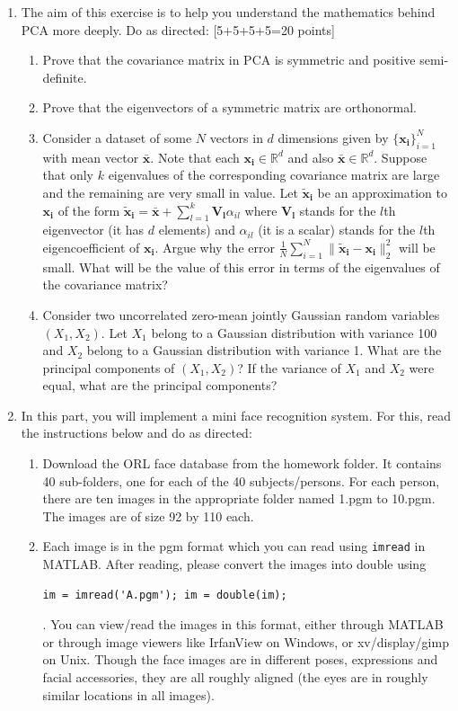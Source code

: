 \documentclass[11pt]{article}
\begin{document}
\begin{enumerate}
\item The aim of this exercise is to help you understand the mathematics behind PCA more deeply. Do as directed: \textsf{[5+5+5+5=20 points]}
\begin{enumerate}
\item Prove that the covariance matrix in PCA is symmetric and positive semi-definite.
\item Prove that the eigenvectors of a symmetric matrix are orthonormal.
\item Consider a dataset of some $N$ vectors in $d$ dimensions given by $\{\boldsymbol{x_i}\}_{i=1}^N$ with mean vector $\boldsymbol{\bar{x}}$. Note that each $\boldsymbol{x_i} \in \mathbb{R}^d$ and also $\boldsymbol{\bar{x}} \in \mathbb{R}^d$.
Suppose that only $k$ eigenvalues of the corresponding covariance matrix are large and the remaining are very small in value. Let $\boldsymbol{\tilde{x}_i}$ be an approximation to $\boldsymbol{x_i}$ of the form $\boldsymbol{\tilde{x}_i} = \boldsymbol{\bar{x}} + \sum_{l=1}^k \boldsymbol{V_l} \alpha_{il}$ where $\boldsymbol{V_l}$ stands for the $l$th eigenvector (it has $d$ elements) and $\alpha_{il}$ (it is a scalar) stands for the $l$th eigencoefficient of $\boldsymbol{x_i}$. Argue why the error $\frac{1}{N} \sum_{i=1}^N \|\boldsymbol{\tilde{x}_i} - \boldsymbol{x_i}\|^2_2$ will be small. What will be the value of this error in terms of the eigenvalues of the covariance matrix?   
\item Consider two uncorrelated zero-mean jointly Gaussian random variables $(X_1, X_2)$. Let $X_1$ belong to a Gaussian distribution with variance 100 and $X_2$ belong to a Gaussian distribution with variance 1. What are the principal components of $(X_1, X_2)$? If the variance of $X_1$ and $X_2$ were equal, what are the principal components? 
\end{enumerate}

\item In this part, you will implement a mini face recognition system. For this, read the instructions below and do as directed:
\begin{enumerate}
\item Download the ORL face database from the homework folder. It contains 40 sub-folders, one for each of the 40 subjects/persons. For each person, there are ten images in the appropriate folder named 1.pgm to 10.pgm. The images are of size 92 by 110 each. 

\item Each image is in the pgm format which you can read using \texttt{imread} in MATLAB. After reading, please convert the images into double using \begin{verbatim}im = imread('A.pgm'); im = double(im);\end{verbatim}. You can view/read the images in this format, either through MATLAB or through image viewers like IrfanView on Windows, or xv/display/gimp on Unix. Though the face images are in different poses, expressions and facial accessories, they are all roughly aligned (the eyes are in roughly similar locations in all images). 


\end{enumerate}
\end{enumerate}
\end{document}
